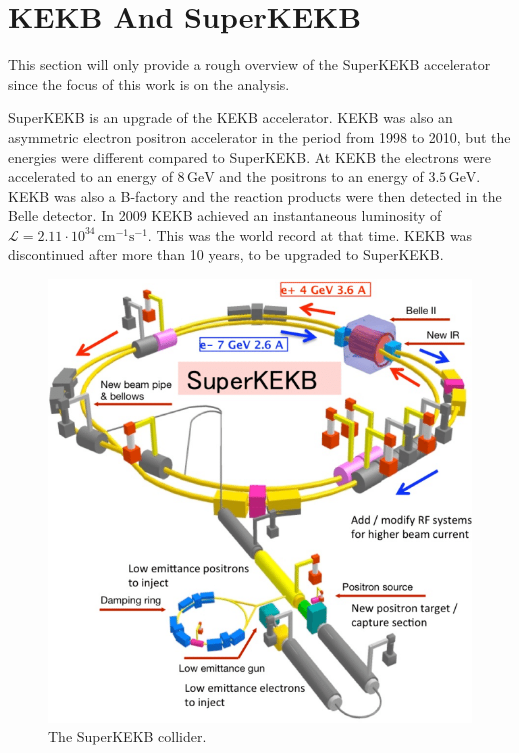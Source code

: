 \documentclass[a4paper,11pt,twosided,final,german,openbib,pdftex,listof=totoc,bibliography=totoc]{scrbook}
\begin{document}
\section{KEKB And SuperKEKB}
\label{sec:KEK}
This section will only provide a rough overview of the SuperKEKB accelerator since the focus of this work is on the analysis. 

SuperKEKB is an upgrade of the KEKB accelerator. KEKB was also an asymmetric electron positron accelerator in the period from 1998 to 2010, but the energies were different compared to SuperKEKB. At KEKB the electrons were accelerated to an energy of $8\,\textrm{GeV}$ and the positrons to an energy of $3.5\,\textrm{GeV}$. KEKB was also a B-factory and the reaction products were then detected in the Belle detector. In 2009 KEKB achieved an instantaneous luminosity of $\mathcal{L} = 2.11 \cdot 10^{34}\,\textrm{cm}^{-1}\textrm{s}^{-1}$. This was the world record at that time. KEKB was discontinued after more than 10 years, to be upgraded to SuperKEKB.\cite{PTEP}


\begin{figure}[h!]
\begin{center}
	\includegraphics[width=\textwidth]{Bilder/SuperKEKB.png}
	
	\caption[SuperKEKB Collider]{The SuperKEKB collider.\cite{SKEKAcc}}
	\label{fig:SuperKEKB}
\end{center}
\end{figure}
\end{document}
